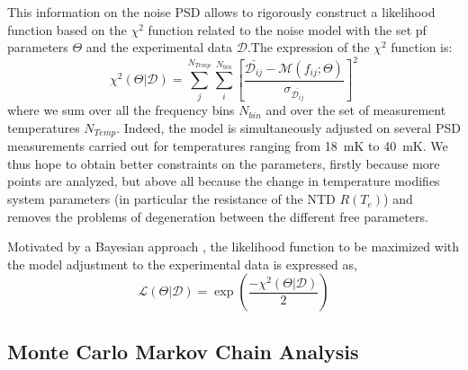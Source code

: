 This information on the noise PSD   allows to rigorously construct a likelihood function based on the $\chi^2$ function related to the noise model with the set pf parameters $\Theta$ and the experimental data $\mathcal{D}$.The expression of the $\chi^2$ function is:
\begin{equation}
\label{chi2}
\chi ^2 (\Theta|\mathcal{D}) = \sum^{N_{Temp}}_{j} \sum^{N_{bin}}_{i} \left[ \frac{\bar{\mathcal{D}_{ij}} - \mathcal{M}(f_{ij}; \Theta)}{\sigma_{\bar{\mathcal{D}_{ij}}}} \right]^2
\end{equation}
where we sum over all the frequency bins $N_{bin}$ and over the set of measurement temperatures $N_{Temp}$. Indeed, the model is simultaneously adjusted on several PSD measurements carried out for temperatures ranging from \SI{18}{\milli\kelvin} to \SI{40}{\milli\kelvin}. We thus hope to obtain better constraints on the parameters, firstly because more points are analyzed, but above all because the change in temperature modifies system parameters (in particular the resistance of the NTD $R(T_e)$) and removes the problems of degeneration between the different free parameters.

Motivated by a Bayesian approach \cite{Billard:2012}, the likelihood function to be maximized with the model adjustment to the experimental data is expressed as,
\begin{equation}
\label{likelihood}
\mathcal{L}(\Theta | \mathcal{D}) = \exp{\left(\frac{-\chi ^2 (\Theta|\mathcal{D})}{2}\right)}
\end{equation}

\subsection{Monte Carlo Markov Chain Analysis }
\label{par:mcmc}

